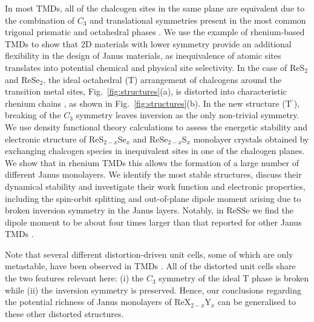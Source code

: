 \documentclass[reprint, superscriptaddress, amsmath,amssymb,prb,twocolumn]{revtex4-2}
\begin{document}
In most TMDs, all of the chalcogen sites in the same plane are equivalent due to the combination of $C_{3}$ and translational symmetries present in the most common trigonal prismatic and octahedral phases \cite{manzelli_nrm_2017}. We use the example of rhenium-based TMDs to show that 2D materials with lower symmetry provide an additional flexibility in the design of Janus materials, as inequivalence of atomic sites translates into potential chemical and physical site selectivity. In the case of ReS$_{2}$ and ReSe$_{2}$, the ideal octahedral (T) arrangement of chalcogens around the transition metal sites, Fig.~\ref{fig:structures}(a), is distorted into characteristic rhenium chains \cite{lamfers_jac_1996, kertesz_jacs_1984}, as shown in Fig.~\ref{fig:structures}(b). In the new structure (T$^\prime$), breaking of the $C_{3}$ symmetry leaves inversion as the only non-trivial symmetry. We use density functional theory calculations to assess the energetic stability and electronic structure of ReS$_{2-x}$Se$_{x}$ and ReSe$_{2-x}$S$_{x}$ monolayer crystals obtained by exchanging chalcogen species in inequivalent sites in one of the chalcogen planes. We show that in rhenium TMDs this allows the formation of a large number of different Janus monolayers. We identify the most stable structures, discuss their dynamical stability and investigate their work function and electronic properties, including the spin-orbit splitting and out-of-plane dipole moment arising due to broken inversion symmetry in the Janus layers. Notably, in ReSSe we find the dipole moment to be about four times larger than that reported for other Janus TMDs \cite{riis-jensen_jpcc_2018, Xia_2018}.

Note that several different distortion-driven unit cells, some of which are only metastable, have been observed in TMDs \cite{manzelli_nrm_2017, qian_science_2014, sokolikova_csr_2020}. All of the distorted unit cells share the two features relevant here: (i) the $C_{3}$ symmetry of the ideal T phase is broken while (ii) the inversion symmetry is preserved. Hence, our conclusions regarding the potential richness of Janus monolayers of ReX$_{2-x}$Y$_{x}$ can be generalised to these other distorted structures.
\end{document}
